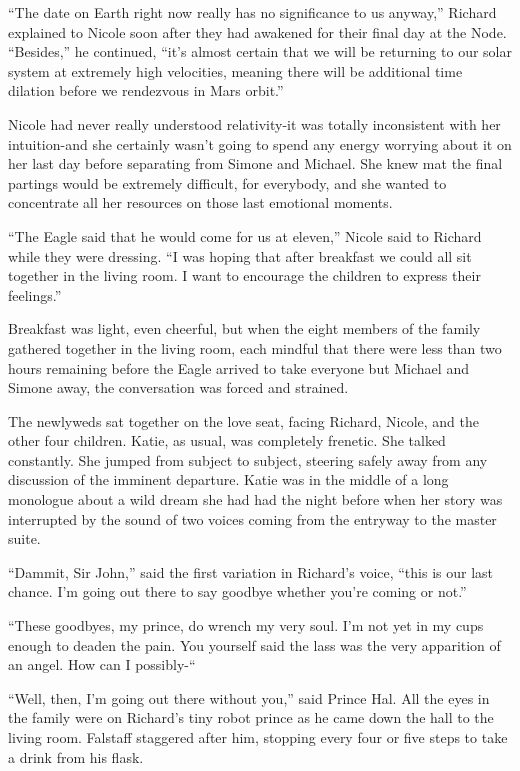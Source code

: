 \documentclass[]{article}
\begin{document}
{“The date on Earth right now really has no significance to us anyway,” Richard explained to Nicole soon after they had awakened for their final day at the Node.  “Besides,” he continued, “it’s almost certain that we will be returning to our solar system at extremely high velocities, meaning there will be additional time dilation before we rendezvous in Mars orbit.”

Nicole had never really understood relativity-it was totally inconsistent with her intuition-and she certainly wasn’t going to spend any energy worrying about it on her last day before separating from Simone and Michael.  She knew mat the final partings would be extremely difficult, for everybody, and she wanted to concentrate all her resources on those last emotional moments.

“The Eagle said that he would come for us at eleven,” Nicole said to Richard while they were dressing.  “I was hoping that after breakfast we could all sit together in the living room.  I want to encourage the children to express their feelings.”

Breakfast was light, even cheerful, but when the eight members of the family gathered together in the living room, each mindful that there were less than two hours remaining before the Eagle arrived to take everyone but Michael and Simone away, the conversation was forced and strained.

The newlyweds sat together on the love seat, facing Richard, Nicole, and the other four children.  Katie, as usual, was completely frenetic.  She talked constantly.  She jumped from subject to subject, steering safely away from any discussion of the imminent departure.  Katie was in the middle of a long monologue about a wild dream she had had the night before when her story was interrupted by the sound of two voices coming from the entryway to the master suite.

“Dammit, Sir John,” said the first variation in Richard’s voice, “this is our last chance.  I’m going out there to say goodbye whether you’re coming or not.”

“These goodbyes, my prince, do wrench my very soul.  I’m not yet in my cups enough to deaden the pain.  You yourself said the lass was the very apparition of an angel.  How can I possibly-“

“Well, then, I’m going out there without you,” said Prince Hal.  All the eyes in the family were on Richard’s tiny robot prince as he came down the hall to the living room.  Falstaff staggered after him, stopping every four or five steps to take a drink from his flask.

}
\end{document}
